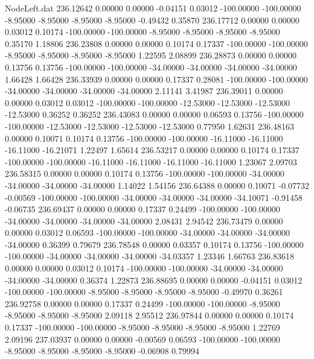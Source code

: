 \begin{filecontents}{NodeLeft.dat}
 236.12642    0.00000    0.00000    -0.04151    0.03012 -100.00000 -100.00000   -8.95000   -8.95000   -8.95000   -8.95000   -0.49432    0.35870
 236.17712    0.00000    0.00000     0.03012    0.10174 -100.00000 -100.00000   -8.95000   -8.95000   -8.95000   -8.95000    0.35170    1.18806
 236.23808    0.00000    0.00000     0.10174    0.17337 -100.00000 -100.00000   -8.95000   -8.95000   -8.95000   -8.95000    1.22595    2.08899
 236.28873    0.00000    0.00000     0.13756    0.13756 -100.00000 -100.00000  -34.00000  -34.00000  -34.00000  -34.00000    1.66428    1.66428
 236.33939    0.00000    0.00000     0.17337    0.28081 -100.00000 -100.00000  -34.00000  -34.00000  -34.00000  -34.00000    2.11141    3.41987
 236.39011    0.00000    0.00000     0.03012    0.03012 -100.00000 -100.00000  -12.53000  -12.53000  -12.53000  -12.53000    0.36252    0.36252
 236.43083    0.00000    0.00000     0.06593    0.13756 -100.00000 -100.00000  -12.53000  -12.53000  -12.53000  -12.53000    0.77950    1.62631
 236.48163    0.00000    0.10071     0.10174    0.13756 -100.00000 -100.00000  -16.11000  -16.11000  -16.11000  -16.21071    1.22497    1.65614
 236.53217    0.00000    0.00000     0.10174    0.17337 -100.00000 -100.00000  -16.11000  -16.11000  -16.11000  -16.11000    1.23067    2.09703
 236.58315    0.00000    0.00000     0.10174    0.13756 -100.00000 -100.00000  -34.00000  -34.00000  -34.00000  -34.00000    1.14022    1.54156
 236.64388    0.00000    0.10071    -0.07732   -0.00569 -100.00000 -100.00000  -34.00000  -34.00000  -34.00000  -34.10071   -0.91458   -0.06735
 236.69437    0.00000    0.00000     0.17337    0.24499 -100.00000 -100.00000  -34.00000  -34.00000  -34.00000  -34.00000    2.08431    2.94542
 236.73479    0.00000    0.00000     0.03012    0.06593 -100.00000 -100.00000  -34.00000  -34.00000  -34.00000  -34.00000    0.36399    0.79679
 236.78548    0.00000    0.03357     0.10174    0.13756 -100.00000 -100.00000  -34.00000  -34.00000  -34.00000  -34.03357    1.23346    1.66763
 236.83618    0.00000    0.00000     0.03012    0.10174 -100.00000 -100.00000  -34.00000  -34.00000  -34.00000  -34.00000    0.36374    1.22873
 236.88695    0.00000    0.00000    -0.04151    0.03012 -100.00000 -100.00000   -8.95000   -8.95000   -8.95000   -8.95000   -0.49970    0.36261
 236.92758    0.00000    0.00000     0.17337    0.24499 -100.00000 -100.00000   -8.95000   -8.95000   -8.95000   -8.95000    2.09118    2.95512
 236.97844    0.00000    0.00000     0.10174    0.17337 -100.00000 -100.00000   -8.95000   -8.95000   -8.95000   -8.95000    1.22769    2.09196
 237.03937    0.00000    0.00000    -0.00569    0.06593 -100.00000 -100.00000   -8.95000   -8.95000   -8.95000   -8.95000   -0.06908    0.79994

\end{filecontents}
